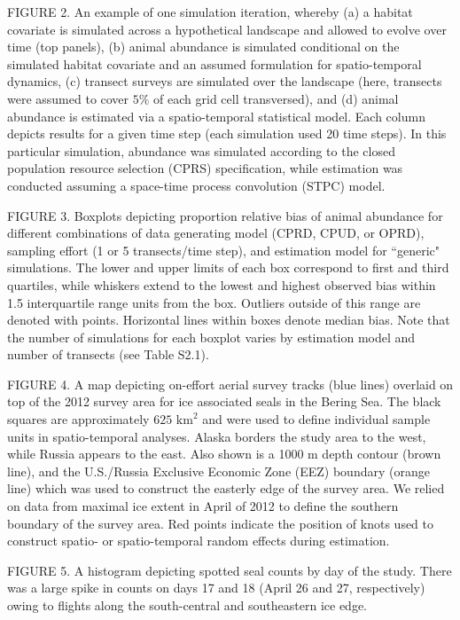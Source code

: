 \documentclass[12pt,english]{article}
\begin{document}
\begin{spacing}{1.9}
FIGURE 2. An example of one simulation iteration, whereby (a) a habitat covariate is simulated across a hypothetical landscape and allowed to evolve over time (top panels), (b) animal abundance is simulated conditional on the simulated habitat covariate and an assumed formulation for spatio-temporal dynamics, (c) transect surveys are simulated over the landscape (here, transects were assumed to cover $5\%$ of each grid cell transversed), and (d) animal abundance is estimated via a spatio-temporal statistical model.  Each column depicts results for a given time step (each simulation used 20 time steps).  In this particular simulation, abundance was simulated according to the closed population resource selection (CPRS) specification, while estimation was conducted assuming a space-time process convolution (STPC) model.

FIGURE 3. Boxplots depicting proportion relative bias of animal abundance for different combinations of data generating model (CPRD, CPUD, or OPRD), sampling effort (1 or 5 transects/time step), and estimation model for ``generic" simulations.  The lower and upper limits of each box correspond to first and third quartiles, while whiskers extend to the lowest and highest observed bias within 1.5 interquartile range units from the box.  Outliers outside of this range are denoted with points.  Horizontal lines within boxes denote median bias.  Note that the number of simulations for each boxplot varies by estimation model and number of transects (see Table S2.1).

FIGURE 4. A map depicting on-effort aerial survey tracks (blue lines) overlaid on top of the 2012 survey area for ice associated seals in the Bering Sea.  The black squares are approximately $625 \text{ km}^2$ and were used to define individual sample units in spatio-temporal analyses.  Alaska borders the study area to the west, while Russia appears to the east.  Also shown is a 1000 m depth contour (brown line), and the U.S./Russia Exclusive Economic Zone (EEZ) boundary (orange line) which was used to construct the easterly edge of the survey area.  We relied on data from maximal ice extent in April of 2012 to define the southern boundary of the survey area.  Red points indicate the position of knots used to construct spatio- or spatio-temporal random effects during estimation.

FIGURE 5. A histogram depicting spotted seal counts by day of the study.  There was a large spike in counts on days 17 and 18 (April 26 and 27, respectively) owing to flights along the south-central and southeastern ice edge.


\end{spacing}
\end{document}
